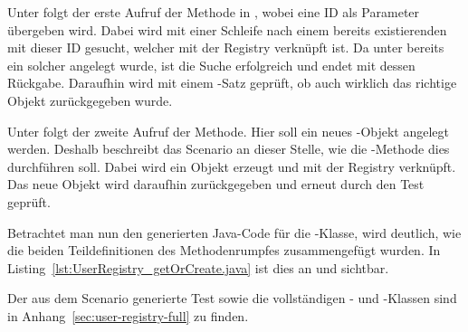 Unter  folgt der erste Aufruf der Methode  in ,
wobei eine ID als Parameter übergeben wird.
Dabei wird mit einer Schleife nach einem bereits existierenden  mit dieser ID gesucht, welcher mit der Registry verknüpft ist.
Da unter  bereits ein solcher angelegt wurde, ist die Suche erfolgreich und endet mit dessen Rückgabe.
Daraufhin wird mit einem -Satz geprüft, ob auch wirklich das richtige Objekt zurückgegeben wurde.

Unter  folgt der zweite Aufruf der Methode.
Hier soll ein neues -Objekt angelegt werden.
Deshalb beschreibt das Scenario an dieser Stelle, wie die -Methode dies durchführen soll.
Dabei wird ein Objekt erzeugt und mit der Registry verknüpft.
Das neue Objekt wird daraufhin zurückgegeben und erneut durch den Test geprüft.

Betrachtet man nun den generierten Java-Code für die -Klasse,
wird deutlich, wie die beiden Teildefinitionen des Methodenrumpfes zusammengefügt wurden.
In Listing~\ref{lst:UserRegistry_getOrCreate.java} ist dies an  und  sichtbar.


Der aus dem Scenario generierte Test sowie die vollständigen - und -Klassen sind in Anhang~\ref{sec:user-registry-full} zu finden.
